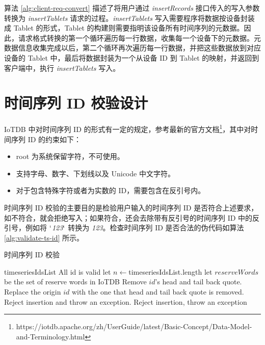 算法 \ref{alg:client-req-convert} 描述了将用户通过  \emph{insertRecords} 接口传入的写入参数转换为 \emph{insertTablets} 请求的过程。\emph{insertTablets} 写入需要程序将数据按设备封装成 Tablet 的形式，Tablet 的构建则需要指明该设备所有时间序列的元数据。因此，请求格式转换的第一个循环遍历每一行数据，收集每一个设备下的元数据。元数据信息收集完成以后，第二个循环再次遍历每一行数据，并把这些数据放到对应设备的 Tablet 中，最后将数据封装为一个从设备 ID 到 Tablet 的映射，并返回到客户端中，执行 \emph{insertTablets} 写入。

\section{时间序列 ID 校验设计}
IoTDB 中对时间序列 ID 的形式有一定的规定，参考最新的官方文档\footnote{https://iotdb.apache.org/zh/UserGuide/latest/Basic-Concept/Data-Model-and-Terminology.html}，其中对时间序列 ID 的约束如下：
\begin{itemize}
  \item root 为系统保留字符，不可使用。
  \item 支持字母、数字、下划线以及 Unicode 中文字符。
  \item 对于包含特殊字符或者为实数的 ID，需要包含在反引号内。
\end{itemize}
时间序列 ID 校验的主要目的是检验用户输入的时间序列 ID 是否符合上述要求，如不符合，就会拒绝写入；如果符合，还会去除带有反引号的时间序列 ID 中的反引号，例如将 $`$\emph{123}$`$ 转换为 \emph{123}。检查时间序列 ID 是否合法的伪代码如算法 \ref{alg:validate-ts-id} 所示。
\begin{algorithm}
  \caption{时间序列 ID 校验}
  \label{alg:validate-ts-id}
  \small
  \begin{algorithmic}
    \REQUIRE timeseriesIdsList
    \ENSURE All id is valid
    \STATE let $n \leftarrow $timeseriesIdsList.length
    \STATE let $reserveWords$ be the set of reserve words in IoTDB
      \STATE Remove $id$'s head and tail back quote. 
      \STATE Replace the origin $id$ with the one that head and tail back quote is removed.
      \ELSE
      \STATE Reject insertion and throw an exception.
      \ENDIF
    \STATE Reject insertion, throw an exception
    \ENDIF
    \ENDFOR
    \ENDFOR
  \end{algorithmic}
\end{algorithm}

